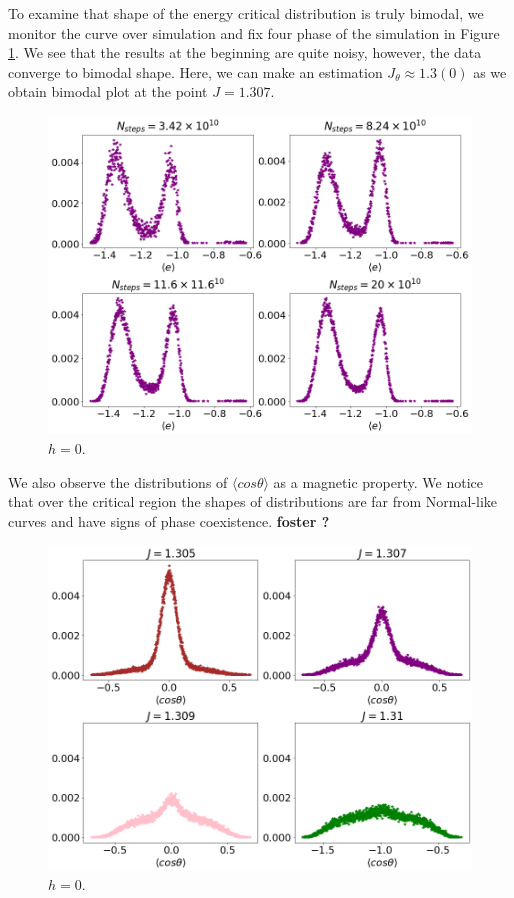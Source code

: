 To examine that shape of the energy critical distribution is truly bimodal, we monitor the curve over simulation and fix four phase of the simulation in Figure \ref{fig:distributione4900}. We see that the results at the beginning are quite noisy, however, the data converge to bimodal shape. Here, we can make an estimation $J_{\theta} \approx 1.3(0)$ as we obtain bimodal plot at the point $J=1.307$. 


 \begin{figure}[H]
	\centering
	\includegraphics[scale=0.36]{Images/distr_energy_4900_time.png}
	\caption{$h=0$.  }
	\label{fig:distributione4900}
\end{figure}

We also observe the distributions of $\langle cos \theta \rangle$ as a magnetic property. We notice that over the critical region the shapes of distributions are far from Normal-like curves and have signs of phase coexistence. \textbf{foster ?}

 \begin{figure}[H]
	\centering
	\includegraphics[scale=0.36]{Images/distr_cos_4900_J.png}
	\caption{$h=0$.  }
	\label{fig:distributioncos4900}
\end{figure}



